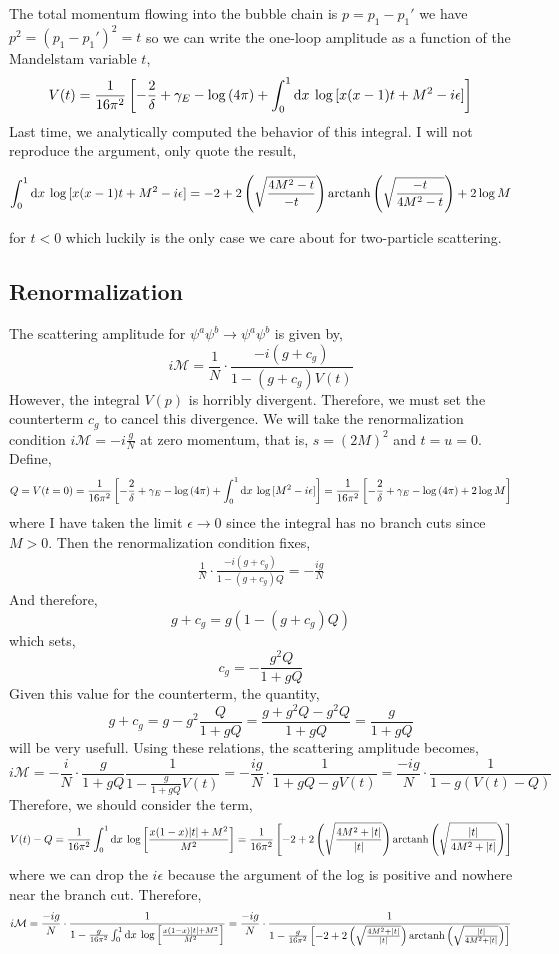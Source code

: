 \documentclass[12pt]{article}
\begin{document}
The total momentum flowing into the bubble chain is $p = p_1 - p_1'$ we have $p^2 = (p_1 - p_1')^2 = t$ so we can write the one-loop amplitude as a function of the Mandelstam variable $t$,
\[ V(t) = \frac{1}{16 \pi^2} \left[ - \frac{2}{\delta} + \gamma_E - \log{(4 \pi)} + \int_0^1 \mathrm{d}x \: \log{[x(x-1) t + M^2 - i \epsilon]} \right] \]
Last time, we analytically computed the behavior of this integral. I will not reproduce the argument, only quote the result,

\[ \int_0^1 \mathrm{d}x \: \log{[x(x-1) t + M^2 - i \epsilon]} = -2 + 2 \left( \sqrt{\frac{4 M^2 - t}{-t}} \right) \mathrm{arctanh} \left( \sqrt{\frac{-t}{4 M^2 - t}} \right) + 2 \log{M} \]

for $ t < 0$ which luckily is the only case we care about for two-particle scattering.

\subsection*{Renormalization} 

The scattering amplitude for $\psi^a \psi^b \to \psi^a \psi^b$ is given by,
\[ i \mathcal{M} = \frac{1}{N} \cdot \frac{-i (g + c_g)}{1 - (g + c_g) V(t)} \]
However, the integral $V(p)$ is horribly divergent. Therefore, we must set the counterterm $c_g$ to cancel this divergence. We will take the renormalization condition $i \mathcal{M} = - i \frac{g}{N}$ at zero momentum, that is, $s = (2 M)^2$ and $t = u = 0$. Define,
\[Q =  V(t = 0) = \frac{1}{16 \pi^2} \left[ - \frac{2}{\delta} + \gamma_E - \log{(4 \pi)} + \int_0^1 \mathrm{d}x \: \log{[M^2 - i \epsilon]} \right]  = \frac{1}{16 \pi^2} \left[ - \frac{2}{\delta} + \gamma_E - \log{(4 \pi)} + 2 \log{M} \right]  \]
where I have taken the limit $\epsilon \to 0$ since the integral has no branch cuts since $M > 0$. 
Then the renormalization condition fixes,
\begin{align*}
\frac{1}{N} \cdot \frac{-i (g + c_g)}{1 - (g + c_g) Q} = - \frac{ig}{N}
\end{align*} 
And therefore,
\[ g + c_g = g(1 - (g + c_g) Q)\] 
which sets,
\[ c_g = -\frac{g^2 Q}{1 + g Q}\]
Given this value for the counterterm, the quantity,
\[ g + c_g = g - g^2 \frac{Q}{1+gQ} = \frac{g + g^2 Q - g^2 Q}{1 + g Q} = \frac{g}{1 + g Q} \]
will be very usefull. Using these relations, the scattering amplitude becomes,
\[ i\mathcal{M} = - \frac{i}{N} \cdot \frac{g}{1 + g Q} \frac{1}{1 - \frac{g}{1 + g Q} V(t)} = - \frac{ig}{N} \cdot  \frac{1}{1 + g Q - g V(t)} = \frac{-ig}{N} \cdot \frac{1}{1 - g (V(t) - Q)} \]
Therefore, we should consider the term,
\[ V(t) - Q = \frac{1}{16 \pi^2} \int_0^1 \mathrm{d}x \: \log{\left[ \frac{x(1-x)|t| + M^2}{M^2} \right]} = \frac{1}{16 \pi^2} \left[ -2 + 2 \left( \sqrt{\frac{4 M^2 + |t|}{|t|}} \right) \mathrm{arctanh} \left( \sqrt{\frac{|t|}{4 M^2 + |t|}} \right) \right] \]
where we can drop the $i \epsilon$ because the argument of the log is positive and nowhere near the branch cut. Therefore,
\[ i \mathcal{M} = \frac{-ig}{N} \cdot \frac{1}{1 - \frac{g}{16 \pi^2} \int_0^1 \mathrm{d}x \: \log{\left[ \frac{x(1-x) |t| + M^2}{M^2} \right]}}  = \frac{-ig}{N} \cdot \frac{1}{1 - \frac{g}{16 \pi^2} \left[ -2 + 2 \left( \sqrt{\frac{4 M^2 + |t|}{|t|}} \right) \mathrm{arctanh} \left( \sqrt{\frac{|t|}{4 M^2 + |t|}} \right) \right]} \]
\end{document}
